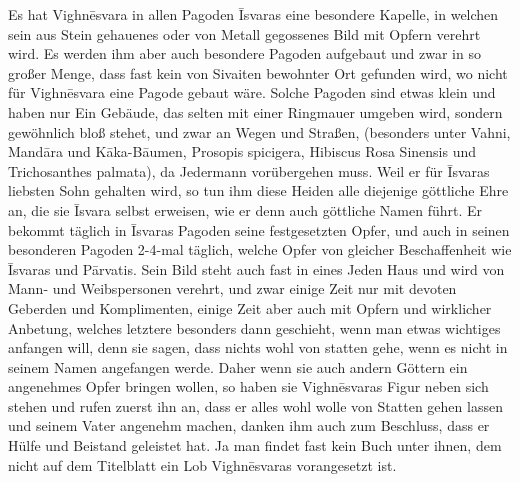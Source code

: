 \documentclass{article}
\begin{document}
Es hat Vighn\={e}svara in allen Pagoden \={I}svaras eine besondere Kapelle, in welchen sein aus Stein gehauenes oder von Metall gegossenes Bild mit Opfern verehrt wird. Es werden ihm aber auch besondere Pagoden aufgebaut und zwar in so großer Menge, dass fast kein von Sivaiten bewohnter Ort gefunden wird, wo nicht für Vighn\={e}svara eine Pagode gebaut wäre. Solche Pagoden sind etwas klein und haben nur Ein Gebäude, das selten mit einer Ringmauer umgeben wird, sondern gewöhnlich bloß stehet, und zwar an Wegen und Straßen, (besonders unter Vahni, Mand\={a}ra und K\={a}ka-B\={a}umen, Prosopis spicigera, Hibiscus Rosa Sinensis und Trichosanthes palmata), da Jedermann vorübergehen muss. Weil er für \={I}svaras liebsten Sohn gehalten wird, so tun ihm diese Heiden alle diejenige göttliche Ehre an, die sie \={I}svara selbst erweisen, wie er denn auch göttliche Namen führt. Er bekommt täglich in \={I}svaras Pagoden seine festgesetzten Opfer, und auch in seinen besonderen Pagoden 2-4-mal täglich, welche Opfer von gleicher Beschaffenheit wie \={I}svaras und P\={a}rvatis. Sein Bild steht auch fast in eines Jeden Haus und wird von Mann- und Weibspersonen verehrt, und zwar einige Zeit nur mit devoten Geberden und Komplimenten, einige Zeit aber auch mit Opfern und wirklicher Anbetung, welches letztere besonders dann geschieht, wenn man etwas wichtiges anfangen will, denn sie sagen, dass nichts wohl von statten gehe, wenn es nicht in seinem Namen angefangen werde. Daher wenn sie auch andern Göttern ein angenehmes Opfer bringen wollen, so haben sie Vighn\={e}svaras Figur neben sich stehen und rufen zuerst ihn an, dass er alles wohl wolle von Statten gehen lassen und seinem Vater angenehm machen, danken ihm auch zum Beschluss, dass er Hülfe und Beistand geleistet hat. Ja man findet fast kein Buch unter ihnen, dem nicht auf dem Titelblatt ein Lob Vighn\={e}svaras vorangesetzt ist.
\end{document}
